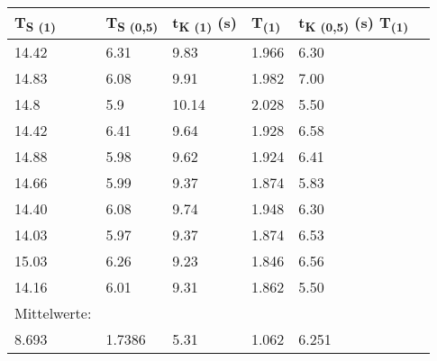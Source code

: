 \documentclass[titlepage=firstcover, captions=tableheading]{scrartcl}
\begin{document}
\begin{center}
    \begin{tabular}{lllllr}
        \toprule 
        T\textsubscript{S (1)} & 
        T\textsubscript{S (0,5)} &
        t\textsubscript{K (1)} (s) &
        T\textsubscript{(1)} & 
        t\textsubscript{K (0,5)} (s)
        T\textsubscript{(1)} & \\
        \midrule
        14.42 & 6.31 &  9.83 & 1.966 & 6.30 & \\
        14.83 & 6.08 &  9.91 & 1.982 & 7.00 & \\
        14.8  & 5.9  & 10.14 & 2.028 & 5.50 & \\
        14.42 & 6.41 &  9.64 & 1.928 & 6.58 & \\
        14.88 & 5.98 &  9.62 & 1.924 & 6.41 & \\
        14.66 & 5.99 &  9.37 & 1.874 & 5.83 & \\
        14.40 & 6.08 &  9.74 & 1.948 & 6.30 & \\
        14.03 & 5.97 &  9.37 & 1.874 & 6.53 & \\
        15.03 & 6.26 &  9.23 & 1.846 & 6.56 & \\
        14.16 & 6.01 &  9.31 & 1.862 & 5.50 & \\
        \midrule
        Mittelwerte:\\
        8.693 & 1.7386 & 5.31 & 1.062 & 6.251\\
        
        \bottomrule
        
    \end{tabular}
\end{center}
\end{document}
